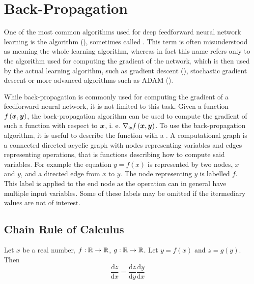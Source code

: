 \chapter{Back-Propagation}\label{backprop}

One of the most common algorithms used for deep feedforward neural network learning is the  algorithm (\cite{rumelhart_learning_1986}), sometimes called . This term is often misunderstood as meaning the whole learning algorithm, whereas in fact this name refers only to the algorithm used for computing the gradient of the network, which is then used by the actual learning algorithm, such as gradient descent (\cite{cauchy_methode_1847}), stochastic gradient descent or more advanced algorithms such as ADAM (\cite{kingma_adam:_2014}).

While back-propagation is commonly used for computing the gradient of a feedforward neural network, it is not limited to this task. Given a function \( f \left( \bm{x}, \bm{y} \right) \), the back-propagation algorithm can be used to compute the gradient of such a function with respect to \( \bm{x} \), i. e. \( \nabla_{\bm{x}} f \left( \bm{x}, \bm{y} \right) \). To use the back-propagation algorithm, it is useful to describe the function with a . A computational graph is a connected directed acyclic graph with nodes representing variables and edges representing operations, that is functions describing how to compute said variables. For example the equation \( y = f \left( x \right) \) is represented by two nodes, \( x \) and \( y \), and a directed edge from \( x \) to \( y \). The node representing \( y \) is labelled \( f \). This label is applied to the end node as the operation can in general have multiple input variables. Some of these labels may be omitted if the itermediary values are not of interest.

\section{Chain Rule of Calculus}
\begin{theorem}\label{chain_rule}
	Let \( x \) be a real number, \( f : \mathbb{R} \to \mathbb{R} \), \( g : \mathbb{R} \to \mathbb{R} \). Let \( y = f \left( x \right) \) and \( z = g \left( y \right) \). Then
	\[ \frac{\mathrm{d} z}{\mathrm{d} x} = \frac{\mathrm{d} z}{\mathrm{d} y} \frac{\mathrm{d} y}{\mathrm{d} x} \]
\end{theorem}

